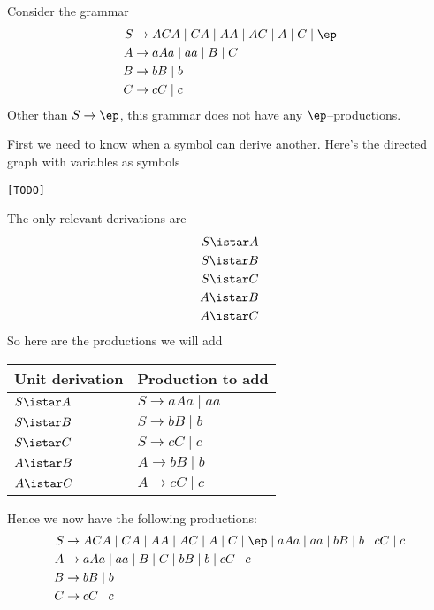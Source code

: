 \newpage
\begin{eg}
Consider the grammar
\begin{align*}
S &\rightarrow ACA \mid CA \mid AA \mid AC \mid A \mid C \mid \ep \\
A &\rightarrow aAa \mid aa \mid B \mid C \\
B &\rightarrow bB \mid b \\
C &\rightarrow cC \mid c
\end{align*}
Other than $S \rightarrow \ep$, this grammar does not have any 
$\ep$--productions.
\end{eg}

First we need to know when a symbol can derive another.
Here's the directed graph with variables as symbols
\begin{verbatim}
[TODO]
\end{verbatim}
The only relevant derivations are
\begin{align*}
S \istar A \\
S \istar B \\
S \istar C \\
A \istar B \\
A \istar C
\end{align*}
So here are the productions we will add
\begin{center}
\begin{tabular}{|l|l|} \hline
Unit derivation & Production to add \\ \hline
$S \istar A$    & $S \rightarrow aAa \mid aa$ \\ \hline
$S \istar B$    & $S \rightarrow bB \mid b$ \\ \hline
$S \istar C$    & $S \rightarrow cC \mid c$ \\ \hline
$A \istar B$    & $A \rightarrow bB \mid b$ \\ \hline
$A \istar C$    & $A \rightarrow cC \mid c$ \\ \hline
\end{tabular}
\end{center}
Hence we now have the following productions:
\begin{align*}
S &\rightarrow ACA \mid CA \mid AA \mid AC \mid A \mid C \mid \ep \mid aAa \mid aa \mid
  bB \mid b \mid cC \mid c \\
A &\rightarrow aAa \mid aa \mid B \mid C \mid bB \mid b \mid cC \mid c \\
B &\rightarrow bB \mid b \\
C &\rightarrow cC \mid c  
\end{align*}

